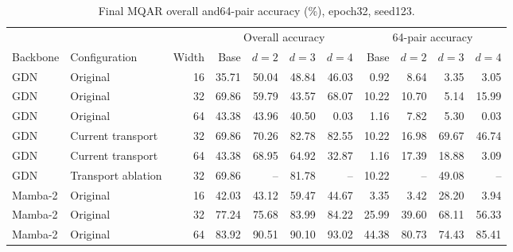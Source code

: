 \begin{table}[t]
\centering
\scriptsize
\caption{Final MQAR overall and64-pair accuracy (\%), epoch32, seed123.}
\begin{tabular}{llrrrrrrrrr}
\toprule
 & & & \multicolumn{4}{c}{Overall accuracy} & \multicolumn{4}{c}{64-pair accuracy} \\
\cmidrule(lr){4-7}\cmidrule(lr){8-11}
Backbone & Configuration & Width & Base & $d=2$ & $d=3$ & $d=4$ & Base & $d=2$ & $d=3$ & $d=4$ \\
\midrule
GDN & Original & 16 & 35.71 & 50.04 & 48.84 & 46.03 & 0.92 & 8.64 & 3.35 & 3.05 \\
GDN & Original & 32 & 69.86 & 59.79 & 43.57 & 68.07 & 10.22 & 10.70 & 5.14 & 15.99 \\
GDN & Original & 64 & 43.38 & 43.96 & 40.50 & 0.03 & 1.16 & 7.82 & 5.30 & 0.03 \\
GDN & Current transport & 32 & 69.86 & 70.26 & 82.78 & 82.55 & 10.22 & 16.98 & 69.67 & 46.74 \\
GDN & Current transport & 64 & 43.38 & 68.95 & 64.92 & 32.87 & 1.16 & 17.39 & 18.88 & 3.09 \\
GDN & Transport ablation & 32 & 69.86 & -- & 81.78 & -- & 10.22 & -- & 49.08 & -- \\
Mamba-2 & Original & 16 & 42.03 & 43.12 & 59.47 & 44.67 & 3.35 & 3.42 & 28.20 & 3.94 \\
Mamba-2 & Original & 32 & 77.24 & 75.68 & 83.99 & 84.22 & 25.99 & 39.60 & 68.11 & 56.33 \\
Mamba-2 & Original & 64 & 83.92 & 90.51 & 90.10 & 93.02 & 44.38 & 80.73 & 74.43 & 85.41 \\
\bottomrule
\end{tabular}
\end{table}
